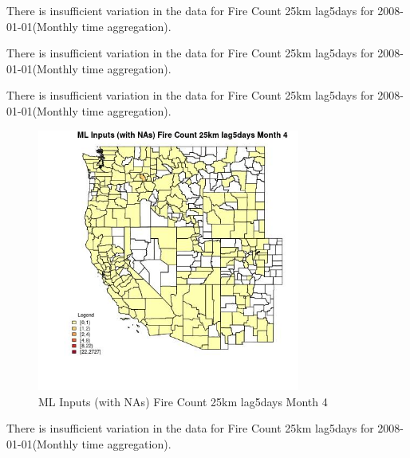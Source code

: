 There is insufficient variation in the data for Fire Count 25km lag5days for 2008-01-01(Monthly time aggregation). 
 

There is insufficient variation in the data for Fire Count 25km lag5days for 2008-01-01(Monthly time aggregation). 
 

There is insufficient variation in the data for Fire Count 25km lag5days for 2008-01-01(Monthly time aggregation). 
 

\begin{figure} 
\centering  
\includegraphics[width=0.77\textwidth]{Code_Outputs/Report_ML_input_PM25_Step4_part_f_de_duplicated_aves_prioritize_24hr_obswNAs_CountyFire_Count_25km_lag5daysmedianMonth4.jpg} 
\caption{\label{fig:Report_ML_input_PM25_Step4_part_f_de_duplicated_aves_prioritize_24hr_obswNAsCountyFire_Count_25km_lag5daysmedianMonth4}ML Inputs (with NAs) Fire Count 25km lag5days Month 4} 
\end{figure} 
 

There is insufficient variation in the data for Fire Count 25km lag5days for 2008-01-01(Monthly time aggregation). 
 


